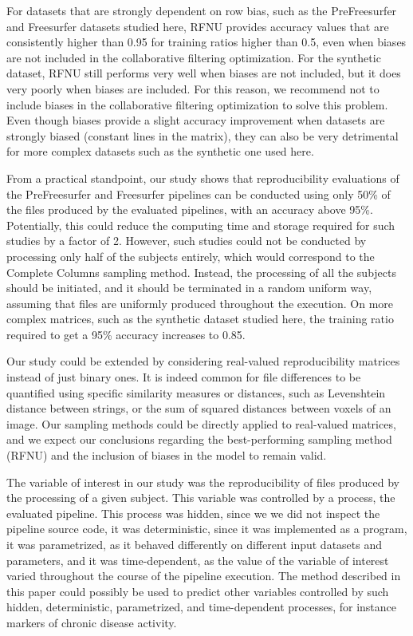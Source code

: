\documentclass[10pt, conference, compsocconf]{IEEEtran}
\begin{document}
For datasets that are strongly dependent on row bias, such as the 
PreFreesurfer and Freesurfer datasets studied here, RFNU provides 
accuracy values that are consistently higher than 0.95 for training 
ratios higher than 0.5, even 
when biases are not included in the collaborative filtering 
optimization. For the synthetic dataset, RFNU still performs very well 
when biases are not included, but it does very poorly when biases are included.
For this reason, we recommend not to include biases in the collaborative filtering 
optimization to solve this problem. Even though biases provide a slight 
accuracy improvement when datasets are strongly biased (constant lines 
in the matrix), they can also be very detrimental for more complex 
datasets such as the synthetic one used here.

From a practical standpoint, our study shows that reproducibility 
evaluations of the PreFreesurfer and Freesurfer pipelines can be 
conducted using only 50\% of the files produced by the evaluated 
pipelines, with an accuracy above 95\%. Potentially, this could reduce 
the computing time and storage required for such studies by a factor of 
2. However, such studies could not be conducted by processing only half 
of the subjects entirely, which would correspond to the Complete 
Columns sampling method. Instead, the processing of all the subjects 
should be initiated, and it should be terminated in a random uniform 
way, assuming that files are uniformly produced throughout the 
execution. On more complex matrices, such as the synthetic dataset 
studied here, the training ratio required to get a 95\% accuracy 
increases to 0.85.



Our study could be extended by considering real-valued reproducibility 
matrices instead of just binary ones. It is indeed common for file 
differences to be quantified using specific similarity measures or 
distances, such as Levenshtein distance between strings, or the sum of 
squared distances between voxels of an image. Our sampling methods 
could be directly applied to real-valued matrices, and we expect our 
conclusions regarding the best-performing sampling method (RFNU) and 
the inclusion of biases in the model to remain valid.

The variable of interest in our study was the reproducibility of files 
produced by the processing of a given subject. This variable was controlled by 
a process, the evaluated pipeline. This process was hidden, since we 
we did not inspect the pipeline source 
code, it was deterministic, since it was implemented as a program, it 
was parametrized, as it behaved differently on different input datasets 
and parameters, and it was time-dependent, as the value of the 
variable of interest varied throughout the course of the pipeline 
execution. The method described in this paper could possibly be used to 
predict other variables controlled by such hidden, deterministic, 
parametrized, and time-dependent processes, for instance markers of 
chronic disease activity.
\end{document}
